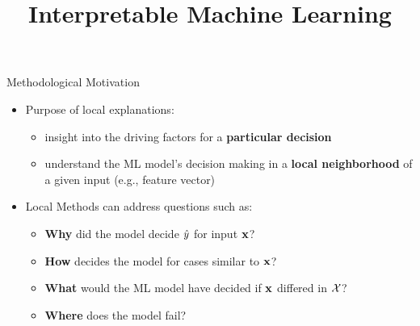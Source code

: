 \documentclass[11pt,compress,t,notes=noshow, aspectratio=169, xcolor=table]{beamer}
\title{Interpretable Machine Learning}
\date{}
\begin{document}



 \newcommand{\titlefigure}{figure/lime.png}
\newcommand{\learninggoals}{
\item Understand motivation for local explanations 
\item Develop an intuition for possible use-cases
\item Know characteristics of local explanation methods}



\begin{vbframe}[c]{Methodological Motivation}


	\begin{itemize}
	    \item Purpose of local explanations:
	    \begin{itemize}
	        \item insight into the driving factors for a \textbf{particular decision}
	        \item understand the ML model's decision making in a \textbf{local neighborhood} of a given input (e.g., feature vector)
	    \end{itemize}
	    \medskip
	    \pause
		\item Local Methods can address questions such as: 
		\begin{itemize}
		    \item \textbf{Why} did the model decide $\yh$ for input $\xv$?
		    \item \textbf{How} decides the model for cases similar to $\xv$?
		    \item \textbf{What} would the ML model have decided if $\xv$ differed in $\Xspace$?
		    \item  \textbf{Where} does the model fail?
		\end{itemize}  
	\end{itemize}
\end{vbframe}
\end{document}
